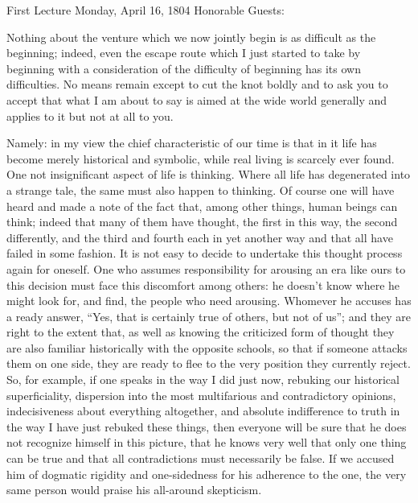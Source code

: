 First Lecture
Monday, April 16, 1804
Honorable Guests:

Nothing about the venture which we now jointly begin
is as difficult as the beginning;
indeed, even the escape route which I just started to take
by beginning with a consideration of the difficulty of beginning
has its own difficulties.
No means remain except to cut the knot boldly
and to ask you to accept that what I am about to say
is aimed at the wide world generally
and applies to it but not at all to you.

Namely: in my view the chief characteristic of our time is
that in it life has become merely historical and symbolic,
while real living is scarcely ever found.
One not insignificant aspect of life is thinking.
Where all life has degenerated into a strange tale,
the same must also happen to thinking.
Of course one will have heard and made a note of the fact that,
among other things, human beings can think;
indeed that many of them have thought, the first in this way,
the second differently, and the third and fourth each in yet another way
and that all have failed in some fashion.
It is not easy to decide to undertake this
thought process again for oneself.
One who assumes responsibility for arousing an era like ours
to this decision must face this discomfort among others:
he doesn't know where he might look for, and find,
the people who need arousing.
Whomever he accuses has a ready answer,
“Yes, that is certainly true of others, but not of us”;
and they are right to the extent that, as well as knowing
the criticized form of thought they are also familiar historically
with the opposite schools, so that if someone attacks them on one side,
they are ready to flee to the very position they currently reject.
So, for example, if one speaks in the way I did just now,
rebuking our historical superficiality,
dispersion into the most multifarious and contradictory opinions,
indecisiveness about everything altogether, and absolute indifference
to truth in the way I have just rebuked these things,
then everyone will be sure that he does not recognize himself in this picture,
that he knows very well that only one thing can be true
and that all contradictions must necessarily be false.
If we accused him of dogmatic rigidity and one-sidedness
for his adherence to the one, the very same person
would praise his all-around skepticism.

